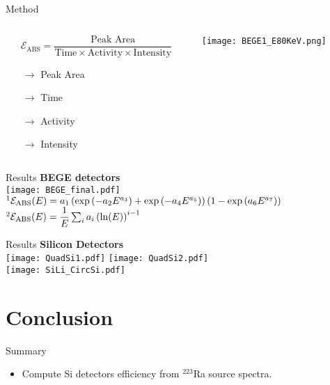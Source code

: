 \documentclass[10pt]{beamer}
\begin{document}
\begin{frame}{Method}
	\begin{columns}
		\begin{column}{0.4\textwidth}
			\begin{overlayarea}{\textwidth}{\textheight}
				\centering
				\small
				\[ \mathcal{E}_{\text{ABS}} = \dfrac{\text{Peak Area}}{\text{Time}\times \text{Activity}\times \text{Intensity}}\]
				\begin{itemize}
					\item[$\rightarrow$] Peak Area
					\item[$\rightarrow$] Time
					\item[$\rightarrow$]	 Activity
					\item[$\rightarrow$] Intensity
				\end{itemize}
			\end{overlayarea}
		\end{column}
		\begin{column}{0.6\textwidth}
			\begin{overlayarea}{\textwidth}{\textheight}
				\centering
				\vspace{0.15\textheight}
				\texttt{[image: BEGE1\_E80KeV.png]}
			\end{overlayarea}
		\end{column}
	\end{columns}
\end{frame}

\begin{frame}{Results}
	\centering
	\vspace{-0.07\textheight}
	\textbf{BEGE detectors}\\
	\vspace{0.01\textheight}
	\texttt{[image: BEGE\_final.pdf]}
	\small
	$\footnote{\tiny Hurtado Garcia-Lenon Nucl. Instr. and Meth. A 594 (2008) 362–367} \mathcal{E}_{\text{ABS}} (E) = a_1 \left(\exp \left(-a_2 E^{a_3}\right)+\exp \left(-a_4 E^{a_5}\right)	\right)\left(1-\exp \left(a_6 E^{a_7}\right)\right) $\\
	$\footnote{\tiny P.W. Gray, A. Ahmad, Nucl. Instr. and Meth. A 237 (1985) 577} \mathcal{E}_{\text{ABS}} (E) = \dfrac{1}{E}\sum_i a_i \left(\ln(E)\right)^{i-1}$
\end{frame}

\begin{frame}{Results}
	\centering
	\vspace{-0.1\textheight}
	\textbf{Silicon Detectors}\\
	\vspace{0.05\textheight}
	\texttt{[image: QuadSi1.pdf]}
	\hspace{0.05\textwidth}
	\texttt{[image: QuadSi2.pdf]}\\
	\texttt{[image: SiLi\_CircSi.pdf]}
\end{frame}

\section{Conclusion}
\begin{frame}{Summary}
	\centering
	\begin{itemize}
		\item Compute Si detectors efficiency from $^{223}$Ra source spectra.
	\end{itemize}
\end{frame}
\end{document}

